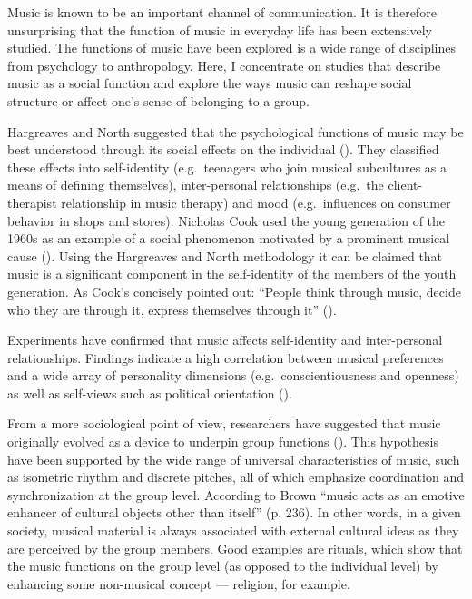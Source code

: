 \documentclass[a4paper,11pt]{article}
\begin{document}
Music is known to be an important channel of communication.
It is therefore unsurprising that the function of music in everyday life has been extensively studied.
The functions of music have been explored is a wide range of disciplines from psychology to anthropology.
Here, I concentrate on studies that describe music as a social function and explore the ways music can reshape social structure or affect one's sense of belonging to a group.

Hargreaves and North suggested that the psychological functions of music may be best understood through its social effects on the individual (\cite*{hargreaves99}).
They classified these effects into self-identity (e.g.\ teenagers who join musical subcultures as a means of defining themselves), inter-personal relationships (e.g.\ the client-therapist relationship in music therapy) and mood (e.g.\ influences on consumer behavior in shops and stores).
Nicholas Cook used the young generation of the 1960s as an example of a social phenomenon motivated by a prominent musical cause (\cite*[p. 5]{cook00}).
Using the Hargreaves and North methodology it can be claimed that music is a significant component in the self-identity of the members of the youth generation.
As Cook's concisely pointed out: ``People think through music, decide who they are through it, express themselves through it'' (\cite*{cook00}).

Experiments have confirmed that music affects self-identity and inter-personal relationships.
Findings indicate a high correlation between musical preferences and a wide array of personality dimensions (e.g.\ conscientiousness and openness) as well as self-views such as political orientation (\cite{rentfrow03}).

From a more sociological point of view, researchers have suggested that music originally evolved as a device to underpin group functions (\cite{Brown2000}).
This hypothesis have been supported by the wide range of universal characteristics of music, such as isometric rhythm and discrete pitches, all of which emphasize coordination and synchronization at the group level.
According to Brown ``music acts as an emotive enhancer of cultural objects other than itself'' (p. 236).
In other words, in a given society, musical material is always associated with external cultural ideas as they are perceived by the group members.
Good examples are rituals, which show that the music functions on the group level (as opposed to the individual level) by enhancing some non-musical concept ---  religion, for example.
\end{document}
